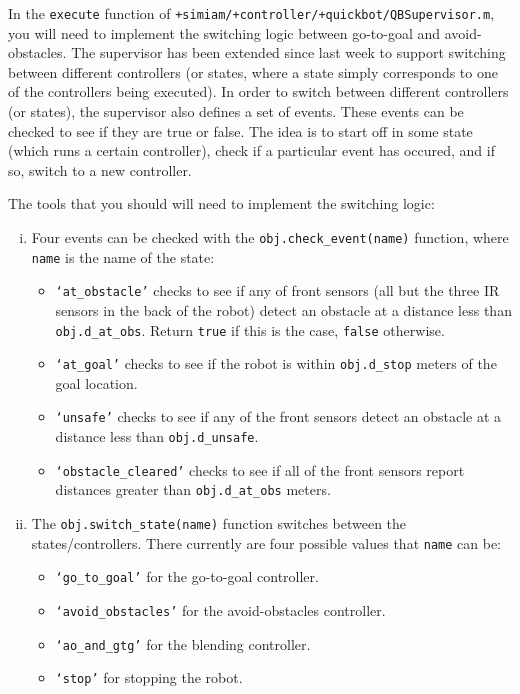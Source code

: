 \documentclass[10pt]{article}
\begin{document}
\begin{enumerate}
  In the \texttt{execute} function of \texttt{+simiam/+controller/+quickbot/QBSupervisor.m}, you will need to implement the switching logic between go-to-goal and avoid-obstacles. The supervisor has been extended since last week to support switching between different controllers (or states, where a state simply corresponds to one of the controllers being executed). In order to switch between different controllers (or states), the supervisor also defines a set of events. These events can be checked to see if they are true or false. The idea is to start off in some state (which runs a certain controller), check if a particular event has occured, and if so, switch to a new controller.
  
  The tools that you should will need to implement the switching logic:
  \begin{enumerate}[(i)]
    \item Four events can be checked with the \texttt{obj.check\_event(name)} function, where \texttt{name} is the name of the state:
      \begin{itemize}
        \item \texttt{`at\_obstacle'} checks to see if any of front sensors (all but the three IR sensors in the back of the robot) detect an obstacle at a distance less than \texttt{obj.d\_at\_obs}. Return \texttt{true} if this is the case, \texttt{false} otherwise.
        \item \texttt{`at\_goal'} checks to see if the robot is within \texttt{obj.d\_stop} meters of the goal location.
        \item \texttt{`unsafe'} checks to see if any of the front sensors detect an obstacle at a distance less than \texttt{obj.d\_unsafe}.
        \item \texttt{`obstacle\_cleared'} checks to see if all of the front sensors report distances greater than \texttt{obj.d\_at\_obs} meters.
      \end{itemize}
    \item The \texttt{obj.switch\_state(name)} function switches between the states/controllers. There currently are four possible values that \texttt{name} can be:
      \begin{itemize}
        \item \texttt{`go\_to\_goal'} for the go-to-goal controller.
        \item \texttt{`avoid\_obstacles'} for the avoid-obstacles controller.
        \item \texttt{`ao\_and\_gtg'} for the blending controller.
        \item \texttt{`stop'} for stopping the robot.
      \end{itemize}
  \end{enumerate}
  

\end{enumerate}
\end{document}
